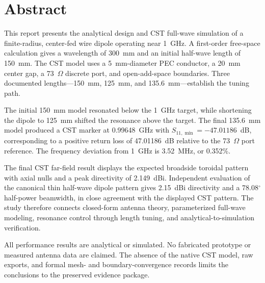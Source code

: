 
\chapter*{Abstract}
\thispagestyle{fancy}
\begingroup
\setlength{\emergencystretch}{2em}

This report presents the analytical design and CST full-wave simulation of a
finite-radius, center-fed wire dipole operating near 1~GHz. A first-order free-space
calculation gives a wavelength of 300~mm and an initial half-wave length of 150~mm.
The CST model uses a 5~mm-diameter PEC conductor, a 20~mm center gap, a 73~$\Omega$
discrete port, and open-add-space boundaries. Three documented lengths---150~mm,
125~mm, and 135.6~mm---establish the tuning path.

The initial 150~mm model resonated below the 1~GHz target, while shortening the
dipole to 125~mm shifted the resonance above the target. The final 135.6~mm model
produced a CST marker at 0.99648~GHz with
$S_{11,\min}=-47.01186$~dB, corresponding to a positive return loss of
47.01186~dB relative to the 73~$\Omega$ port reference. The frequency deviation from
1~GHz is 3.52~MHz, or 0.352\%.

The final CST far-field result displays the expected broadside toroidal pattern with
axial nulls and a peak directivity of 2.149~dBi. Independent evaluation of the canonical
thin half-wave dipole pattern gives 2.15~dBi directivity and a 78.08$^\circ$ half-power
beamwidth, in close agreement with the displayed CST pattern. The study therefore
connects closed-form antenna theory, parameterized full-wave modeling, resonance
control through length tuning, and analytical-to-simulation verification.

All performance results are analytical or simulated. No fabricated prototype or
measured antenna data are claimed. The absence of the native CST model, raw exports,
and formal mesh- and boundary-convergence records limits the conclusions to the
preserved evidence package.
\par\endgroup
